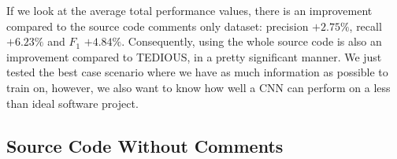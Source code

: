 If we look at the average total performance values, there is an improvement compared to the source code comments only dataset: precision $+ 2.75\%$, recall $+ 6.23\%$ and $F_1$ $+ 4.84\%$. Consequently, using the whole source code is also an improvement compared to TEDIOUS, in a pretty significant manner. We just tested the best case scenario where we have as much information as possible to train on, however, we also want to know how well a CNN can perform on a less than ideal software project.


\subsection{Source Code Without Comments}


\begin{table}[t]
	\caption{Within-project prediction: results of CNN for each system using source code without comments}
	\label{tab:withoutcomments}
	\centering\tiny
	\vspace{-3mm}
\end{table}

